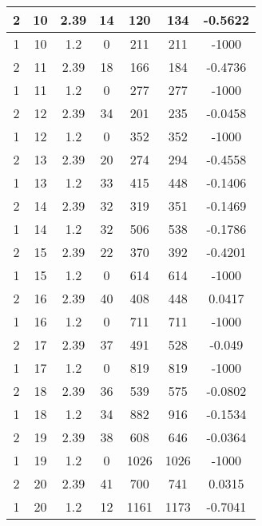 \documentclass[letterpaper, 12pt]{article}
\begin{document}
\begin{longtable}{|c|c|c|c|c|c|c|}
\hline
2 & 10 & 2.39 & 14 & 120 & 134 & -0.5622 \\
\hline
1 & 10 & 1.2 & 0 & 211 & 211 & -1000 \\
\hline
2 & 11 & 2.39 & 18 & 166 & 184 & -0.4736 \\
\hline
1 & 11 & 1.2 & 0 & 277 & 277 & -1000 \\
\hline
2 & 12 & 2.39 & 34 & 201 & 235 & -0.0458 \\
\hline
1 & 12 & 1.2 & 0 & 352 & 352 & -1000 \\
\hline
2 & 13 & 2.39 & 20 & 274 & 294 & -0.4558 \\
\hline
1 & 13 & 1.2 & 33 & 415 & 448 & -0.1406 \\
\hline
2 & 14 & 2.39 & 32 & 319 & 351 & -0.1469 \\
\hline
1 & 14 & 1.2 & 32 & 506 & 538 & -0.1786 \\
\hline
2 & 15 & 2.39 & 22 & 370 & 392 & -0.4201 \\
\hline
1 & 15 & 1.2 & 0 & 614 & 614 & -1000 \\
\hline
2 & 16 & 2.39 & 40 & 408 & 448 & 0.0417 \\
\hline
1 & 16 & 1.2 & 0 & 711 & 711 & -1000 \\
\hline
2 & 17 & 2.39 & 37 & 491 & 528 & -0.049 \\
\hline
1 & 17 & 1.2 & 0 & 819 & 819 & -1000 \\
\hline
2 & 18 & 2.39 & 36 & 539 & 575 & -0.0802 \\
\hline
1 & 18 & 1.2 & 34 & 882 & 916 & -0.1534 \\
\hline
2 & 19 & 2.39 & 38 & 608 & 646 & -0.0364 \\
\hline
1 & 19 & 1.2 & 0 & 1026 & 1026 & -1000 \\
\hline
2 & 20 & 2.39 & 41 & 700 & 741 & 0.0315 \\
\hline
1 & 20 & 1.2 & 12 & 1161 & 1173 & -0.7041 \\
\hline
\end{longtable}
\end{document}
